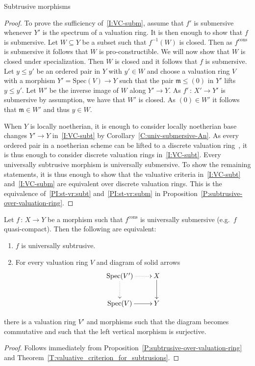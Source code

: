 \documentclass[a4paper,twoside,11pt]{amsart}[2009/07/02] %
\newcommand{\pref}[1]{\eqref{#1}}
\newcommand{\map}[3]{#1\,:\, #2\rightarrow #3}
\newcommand{\Spec}{\mathrm{Spec}}
\newcommand{\cons}{\mathrm{cons}} %
\newcommand\im{\mathfrak{m}} %
\begin{document}
\begin{section}{Subtrusive morphisms}
\begin{proof}
To prove the sufficiency of~\ref{I:VC-subm}, assume that $f'$ is submersive
whenever $Y'$ is the spectrum of a valuation ring. It is then enough to show
that $f$ is submersive. Let $W\subseteq Y$ be a subset such that $f^{-1}(W)$ is
closed. Then as $f^\cons$ is submersive it follows that $W$ is
pro-constructible. We will now show that $W$ is closed under specialization.
Then $W$ is closed and it follows that $f$ is submersive. Let $y\leq y'$ be an
ordered pair in $Y$ with $y'\in W$ and choose a valuation ring $V$ with a
morphism $Y'=\Spec(V)\to Y$ such that the pair $\im\leq (0)$ in $Y'$ lifts
$y\leq y'$. Let $W'$ be the inverse image of $W$ along $Y'\to Y$. As
$\map{f'}{X'}{Y'}$ is submersive by assumption, we have that $W'$ is closed. As
$(0)\in W'$ it follows that $\im\in W'$ and thus $y\in W$.

When $Y$ is locally noetherian, it is enough to consider locally noetherian
base changes $Y'\to Y$ in~\ref{I:VC-subt} by
Corollary~\pref{C:univ-submersive-An}.
As every ordered pair in a noetherian scheme can be lifted to a discrete
valuation ring~\cite[Prop.~7.1.7]{egaII}, it is thus enough to consider
discrete valuation rings in~\ref{I:VC-subt}. Every universally subtrusive
morphism is universally submersive. To show the remaining statements, it is
thus enough to show that the valuative criteria in~\ref{I:VC-subt}
and~\ref{I:VC-subm} are equivalent over discrete valuation rings. This is the
equivalence of~\ref{PI:st-vr:subt} and~\ref{PI:st-vr:subm} in
Proposition~\pref{P:subtrusive-over-valuation-ring}.
\end{proof}

\begin{corollary}
Let $\map{f}{X}{Y}$ be a morphism such that $f^{\cons}$ is universally
submersive (e.g.\ $f$ quasi-compact). Then the following are equivalent:
%
\begin{enumerate}
\item $f$ is universally subtrusive.
\item For every valuation ring $V$ and diagram of solid arrows
%
$$\xymatrix{
\Spec(V')\ar@{.>}[r]\ar@{.>}[d] & X\ar[d]\\
\Spec(V)\ar[r] & Y
}$$
\end{enumerate}
%
there is a valuation ring $V'$ and morphisms such that the diagram
becomes commutative and such that the left vertical morphism is surjective.
\end{corollary}
\begin{proof}
Follows immediately from Proposition~\pref{P:subtrusive-over-valuation-ring}
and Theorem~\pref{T:valuative_criterion_for_subtrusions}.
\end{proof}


\end{section}
\end{document}
